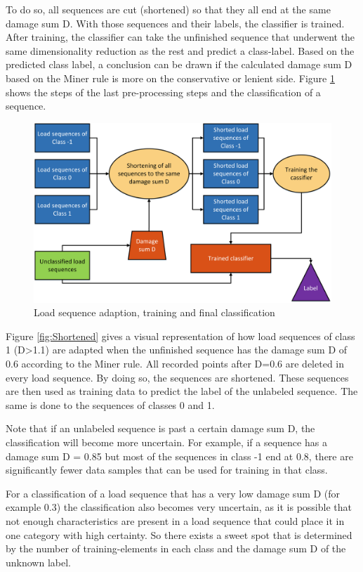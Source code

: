 To do so, all sequences are cut (shortened) so that they all end at the same damage sum D. 
With those sequences and their labels, the classifier is trained.
After training, the classifier can take the unfinished sequence that underwent the same dimensionality reduction as the rest and predict a class-label. 
Based on the predicted class label, a conclusion can be drawn if the calculated damage sum D based on the Miner rule is more on the conservative or lenient side. Figure \ref{fig:Class} shows the steps of the last pre-processing steps and the classification of a sequence.


\begin{figure}[H]
	\centering
	\includegraphics[width=0.9\linewidth]{IMGs/Class.png}
	\caption{Load sequence adaption, training and final classification }
	\label{fig:Class}
\end{figure}


Figure \ref{fig:Shortened} gives a visual representation of how load sequences of class 1 (D>1.1) are adapted when the unfinished sequence has the damage sum D of 0.6 according to the Miner rule.
All recorded points after D=0.6 are deleted in every load sequence. By doing so, the sequences are shortened. These sequences are then used as training data to predict the label of the unlabeled sequence. The same is done to the sequences of classes 0 and 1.

Note that if an unlabeled sequence is past a certain damage sum D, the classification will become more uncertain. For example, if a sequence has a damage sum D = 0.85 but most of the sequences in class -1 end at 0.8, there are significantly fewer data samples that can be used for training in that class. 

For a classification of a load sequence that has a very low damage sum D (for example 0.3) the classification also becomes very uncertain, as it is possible that not enough characteristics are present in a load sequence that could place it in one category with high certainty.
So there exists a sweet spot that is determined by the number of training-elements in each class and the damage sum D of the unknown label.

